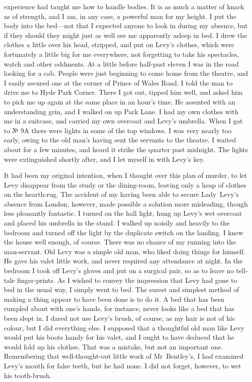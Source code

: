 experience had taught me how to handle bodies. It is as much a matter of knack as of strength, and I am, in any case, a powerful man for my height. I put the body into the bed—not that I expected anyone to look in during my absence, but if they should they might just as well see me apparently asleep in bed. I drew the clothes a little over his head, stripped, and put on Levy's clothes, which were fortunately a little big for me everywhere, not forgetting to take his spectacles, watch and other oddments. At a little before half-past eleven I was in the road looking for a cab. People were just beginning to come home from the theatre, and I easily secured one at the corner of Prince of Wales Road. I told the man to drive me to Hyde Park Corner. There I got out, tipped him well, and asked him to pick me up again at the same place in an hour's time. He assented with an understanding grin, and I walked on up Park Lane. I had my own clothes with me in a suitcase, and carried my own overcoat and Levy's umbrella. When I got to № 9A there were lights in some of the top windows. I was very nearly too early, owing to the old man's having sent the servants to the theatre. I waited about for a few minutes, and heard it strike the quarter past midnight. The lights were extinguished shortly after, and I let myself in with Levy's key.

It had been my original intention, when I thought over this plan of murder, to let Levy disappear from the study or the dining-room, leaving only a heap of clothes on the hearth-rug. The accident of my having been able to secure Lady~Levy's absence from London, however, made possible a solution more misleading, though less pleasantly fantastic. I turned on the hall light, hung up Levy's wet overcoat and placed his umbrella in the stand. I walked up noisily and heavily to the bedroom and turned off the light by the duplicate switch on the landing. I knew the house well enough, of course. There was no chance of my running into the man-servant. Old Levy was a simple old man, who liked doing things for himself. He gave his valet little work, and never required any attendance at night. In the bedroom I took off Levy's gloves and put on a surgical pair, so as to leave no tell-tale finger-prints. As I wished to convey the impression that Levy had gone to bed in the usual way, I simply went to bed. The surest and simplest method of making a thing appear to have been done is to do it. A bed that has been rumpled about with one's hands, for instance, never looks like a bed that has been slept in. I dared not use Levy's brush, of course, as my hair is not of his colour, but I did everything else. I supposed that a thoughtful old man like Levy would put his boots handy for his valet, and I ought to have deduced that he would fold up his clothes. That was a mistake, but not an important one. Remembering that well-thought-out little work of Mr~Bentley's, I had examined Levy's mouth for false teeth, but he had none. I did not forget, however, to wet his tooth-brush.

